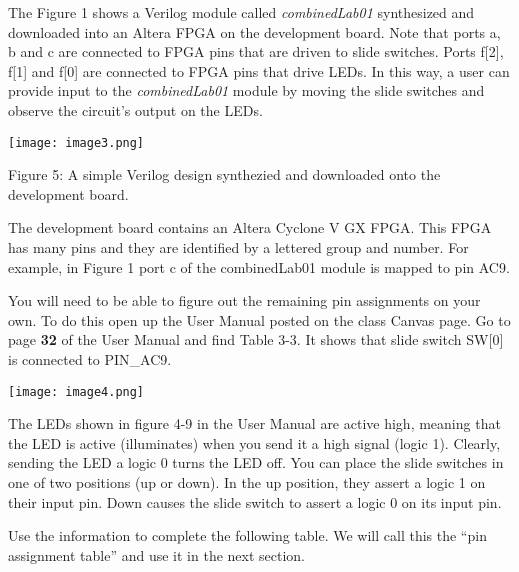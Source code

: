 The Figure 1 shows a Verilog module called \emph{combinedLab01}
synthesized and downloaded into an Altera FPGA on the development board.
Note that ports a, b and c are connected to FPGA pins that are driven to
slide switches. Ports f{[}2{]}, f{[}1{]} and f{[}0{]} are connected to
FPGA pins that drive LEDs. In this way, a user can provide input to the
\emph{combinedLab01} module by moving the slide switches and observe the
circuit's output on the LEDs.

\texttt{[image: image3.png]}

Figure 5: A simple Verilog design synthezied and downloaded onto the
development board.

The development board contains an Altera Cyclone V GX FPGA. This FPGA
has many pins and they are identified by a lettered group and number.
For example, in Figure 1 port c of the combinedLab01 module is mapped to
pin AC9.

You will need to be able to figure out the remaining pin assignments on
your own. To do this open up the User Manual posted on the class Canvas
page. Go to page \textbf{32} of the User Manual and find Table 3-3. It
shows that slide switch SW{[}0{]} is connected to PIN\_AC9.

\texttt{[image: image4.png]}

The LEDs shown in figure 4-9 in the User Manual are active high, meaning
that the LED is active (illuminates) when you send it a high signal
(logic 1). Clearly, sending the LED a logic 0 turns the LED off. You can
place the slide switches in one of two positions (up or down). In the up
position, they assert a logic 1 on their input pin. Down causes the
slide switch to assert a logic 0 on its input pin.

Use the information to complete the following table. We will call this
the ``pin assignment table'' and use it in the next section.

